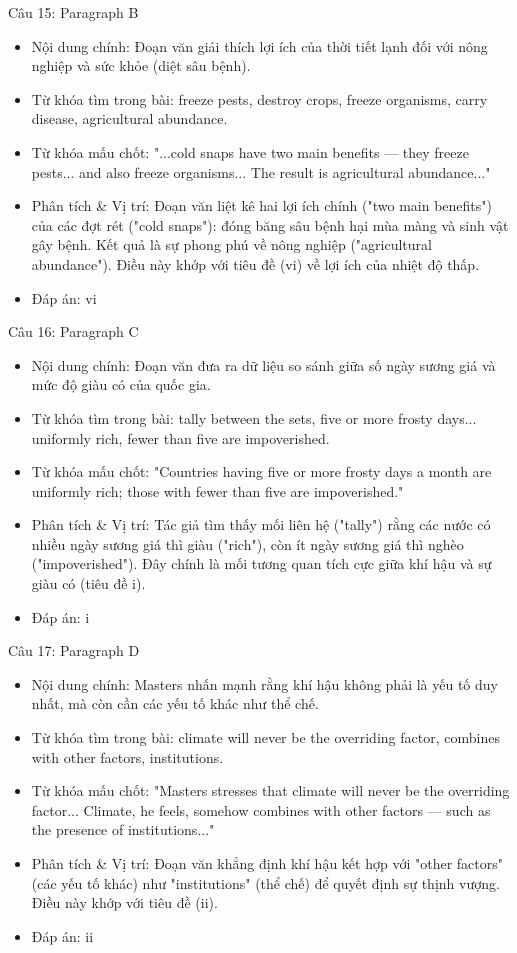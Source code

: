 \documentclass{../templateReading/cdreading}
\begin{document}
Câu 15: Paragraph B
\begin{itemize}
\item Nội dung chính: Đoạn văn giải thích lợi ích của thời tiết lạnh đối với nông nghiệp và sức khỏe (diệt sâu bệnh).
\item Từ khóa tìm trong bài: freeze pests, destroy crops, freeze organisms, carry disease, agricultural abundance.
\item Từ khóa mấu chốt: "...cold snaps have two main benefits — they freeze pests... and also freeze organisms... The result is agricultural abundance..."
\item Phân tích \& Vị trí: Đoạn văn liệt kê hai lợi ích chính ("two main benefits") của các đợt rét ("cold snaps"): đóng băng sâu bệnh hại mùa màng và sinh vật gây bệnh. Kết quả là sự phong phú về nông nghiệp ("agricultural abundance"). Điều này khớp với tiêu đề (vi) về lợi ích của nhiệt độ thấp.
\item Đáp án: vi
\end{itemize}

Câu 16: Paragraph C
\begin{itemize}
\item Nội dung chính: Đoạn văn đưa ra dữ liệu so sánh giữa số ngày sương giá và mức độ giàu có của quốc gia.
\item Từ khóa tìm trong bài: tally between the sets, five or more frosty days... uniformly rich, fewer than five are impoverished.
\item Từ khóa mấu chốt: "Countries having five or more frosty days a month are uniformly rich; those with fewer than five are impoverished."
\item Phân tích \& Vị trí: Tác giả tìm thấy mối liên hệ ("tally") rằng các nước có nhiều ngày sương giá thì giàu ("rich"), còn ít ngày sương giá thì nghèo ("impoverished"). Đây chính là mối tương quan tích cực giữa khí hậu và sự giàu có (tiêu đề i).
\item Đáp án: i
\end{itemize}

Câu 17: Paragraph D
\begin{itemize}
\item Nội dung chính: Masters nhấn mạnh rằng khí hậu không phải là yếu tố duy nhất, mà còn cần các yếu tố khác như thể chế.
\item Từ khóa tìm trong bài: climate will never be the overriding factor, combines with other factors, institutions.
\item Từ khóa mấu chốt: "Masters stresses that climate will never be the overriding factor... Climate, he feels, somehow combines with other factors — such as the presence of institutions..."
\item Phân tích \& Vị trí: Đoạn văn khẳng định khí hậu kết hợp với "other factors" (các yếu tố khác) như "institutions" (thể chế) để quyết định sự thịnh vượng. Điều này khớp với tiêu đề (ii).
\item Đáp án: ii
\end{itemize}
\end{document}
